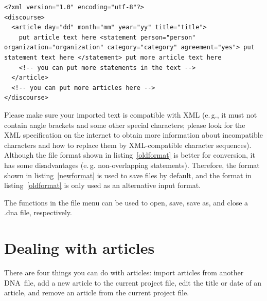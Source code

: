 \documentclass[12pt,a4paper]{scrreprt}
\newcommand{\dnashort}{\textsc{DNA}}
\begin{document}
\begin{lstlisting}[breaklines=true,showstringspaces=false,frame=tlRB]
<?xml version="1.0" encoding="utf-8"?>
<discourse>
  <article day="dd" month="mm" year="yy" title="title">
    put article text here <statement person="person" organization="organization" category="category" agreement="yes"> put statement text here </statement> put more article text here
    <!-- you can put more statements in the text -->
  </article>
  <!-- you can put more articles here -->
</discourse>
\end{lstlisting}

Please make sure your imported text is compatible with XML (e.\,g., it must not contain angle brackets and some other special characters; please look for the XML specification on the internet to obtain more information about incompatible characters and how to replace them by XML-compatible character sequences). Although the file format shown in listing~\ref{oldformat} is better for conversion, it has some disadvantages (e.\,g. non-overlapping statements). Therefore, the format shown in listing~\ref{newformat} is used to save files by default, and the format in listing~\ref{oldformat} is only used as an alternative input format.

The functions in the file menu can be used to open, save, save as, and close a .dna file, respectively.

\section{Dealing with articles}\label{article}
There are four things you can do with articles: import articles from another \dnashort\ file, add a new article to the current project file, edit the title or date of an article, and remove an article from the current project file.
\end{document}
